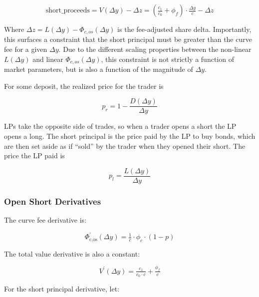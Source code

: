 \begin{equation}\label{short-proceeds}
\text{short\_proceeds} = V(\Delta y) - \Delta z = \left( \tfrac{c_1}{c_0} + \phi_f \right) \cdot \tfrac{\Delta y}{c} - \Delta z
\end{equation}

Where $\Delta z = L(\Delta y) - \Phi_{c,os}(\Delta y)$ is the fee-adjusted share delta.
Importantly, this surfaces a constraint that the short principal must be greater than the curve fee for a given $\Delta y$.
Due to the different scaling properties between the non-linear $L(\Delta y)$ and linear $\Phi_{c,os}(\Delta y)$, this constraint is not strictly a function of market parameters, but is also a function of the magnitude of $\Delta y$.

For some deposit, the realized price for the trader is

\begin{equation}\label{realized-price}
p_r = 1 - \frac{D(\Delta y)}{\Delta y}
\end{equation}

LPs take the opposite side of trades, so when a trader opens a short the LP opens a long.
The short principal is the price paid by the LP to buy bonds, which are then set aside as if ``sold'' by the trader when they opened their short.
The price the LP paid is

\begin{equation}\label{lp-price}
p_{l} = \frac{L(\Delta y)}{\Delta y}
\end{equation}

\subsubsection{Open Short Derivatives}

The curve fee derivative is:

\begin{equation}\label{curve-fee-derivative}
\Phi^{\prime}_{\text{c,os}}(\Delta y) = \tfrac{1}{c} \cdot \phi_{c} \cdot (1 - p)
\end{equation}

The total value derivative is also a constant:

\begin{equation}
V^{\prime}(\Delta y) = \tfrac{c_{1}}{c_{0} \cdot c} + \tfrac{\phi_{f}}{c}
\end{equation}

\label{short-principal-derivative}
For the short principal derivative, let:

